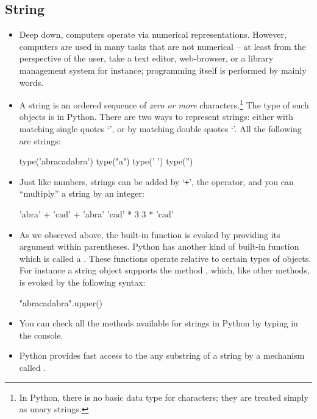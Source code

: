 \documentclass[a4paper]{article}
\begin{document}
\subsection{String}

\begin{itemize}

\item Deep down, computers operate via numerical representations. However,
computers are used in many tasks that are not numerical -- at least from the
perspective of the user, take a text editor, web-browser, or a library
management system for instance; programming itself is performed by mainly words. 

\item A string is an ordered sequence of \emph{zero
or more} characters.\footnote{In Python, there is no basic data type for
characters; they are treated simply as unary strings.} The type of such objects
is  in Python. There are two ways to
represent strings: either with matching single quotes `', or by matching
double quotes `'.  All the following are
strings:

\begin{ucodeframe}
\begin{pyconsole}
type('abracadabra')
type("a")
type(' ')
type('')
\end{pyconsole}
\end{ucodeframe}

\item Just like numbers, strings can be added by `\Verb|+|', the
 operator, and you can ``multiply'' a string by an integer:

\begin{ucodeframe}
\begin{pyconsole}
'abra' + 'cad' + 'abra'
'cad' * 3
3 * 'cad'
\end{pyconsole}
\end{ucodeframe}


\item As we observed above, the built-in function  is evoked by
providing its argument within parentheses. Python has another kind of built-in
function which is called a . These functions operate relative to certain types of objects. For
instance a string object supports the method ,
which, like other methods, is evoked by the following syntax:

\begin{ucodeframe}
\begin{pyconsole}
"abracadabra".upper()
\end{pyconsole}
\end{ucodeframe}

\item You can check all the methods available for strings in Python by typing
 in the console.

\item Python provides fast access to the any substring of a string by a
mechanism called .


\end{itemize}
\end{document}
